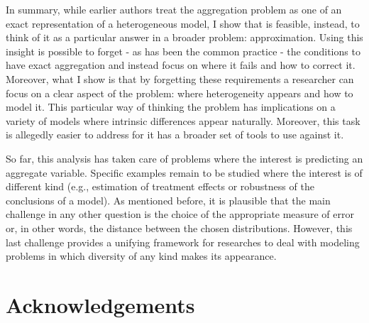 \documentclass[english, a4paper, 12pt]{article}
\begin{document}
In summary, while earlier authors treat the aggregation problem as one of an exact representation of a heterogeneous model, I show that is feasible, instead, to think of it as a particular answer in a broader problem: approximation. Using this insight is possible to forget - as has been the common practice - the conditions to have exact aggregation and instead focus on where it fails and how to correct it. Moreover, what I show is that by forgetting these requirements a researcher can focus on a clear aspect of the problem: where heterogeneity appears and how to model it. This particular way of thinking the problem has implications on a variety of models where intrinsic differences appear naturally. Moreover, this task is allegedly easier to address for it has a broader set of tools to use against it. 

So far, this analysis has taken care of problems where the interest is predicting an aggregate variable. Specific examples remain to be studied where the interest is of different kind (e.g., estimation of treatment effects or robustness of the conclusions of a model). As mentioned before, it is plausible that the main challenge in any other question is the choice of the appropriate measure of error or, in other words, the distance between the chosen distributions. However, this last challenge provides a unifying framework for researches to deal with modeling problems in which diversity of any kind makes its appearance.

\newpage
\section*{Acknowledgements}





\end{document}
